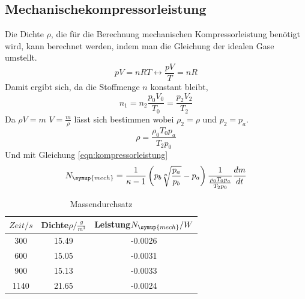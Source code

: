\subsection{Mechanischekompressorleistung}
Die Dichte $\rho$, die für die Berechnung mechanischen Kompressorleistung
benötigt wird, kann berechnet werden, indem man die Gleichung der idealen Gase
umstellt.
\begin{equation}
  pV=nRT \leftrightarrow \frac{pV}{T}=nR
\end{equation}
Damit ergibt sich, da die Stoffmenge $n$ konstant bleibt,
\begin{equation}
  n_1=n_2
  \frac{p_0 V_0}{T_0}=\frac{p_2 V_2}{T_2}
\end{equation}
Da $ \rho V=m$ \leftrightarrow $V= \frac{m}{\rho}$ lässt sich \rho bestimmen wobei
$\rho_2=\rho$ und $p_2=p_a$.
\begin{equation}
  \rho=\frac{\rho_0 T_0 p_a}{T_2 p_0}
\end{equation}
Und mit Gleichung \eqref{eqn:kompressorleistung}
\begin{equation}
N_\symup{mech}=\frac{1}{\kappa-1}\left(p_b \sqrt[\kappa]{\frac{p_a}{p_b}}-p_a\right)\frac{1}{\frac{\rho_0 T_0 p_a}{T_2 p_0}}\frac{dm}{dt}
\end{equation}

\begin{table}
  \centering
\begin{tabular}{c c c}
  \toprule
  $Zeit /s$ & Dichte$\rho/\frac{g}{m^3}$ & Leistung$N_\symup{mech} /W$  \\
  \midrule
  300  &   15.49  &  -0.0026 \\
  600  &   15.05  &  -0.0031 \\
  900  &   15.13  &  -0.0033 \\
 1140  &   21.65  &  -0.0024 \\
 \bottomrule
\end{tabular}
\caption{Massendurchsatz}
\label{tab:Massend}
\end{table}
